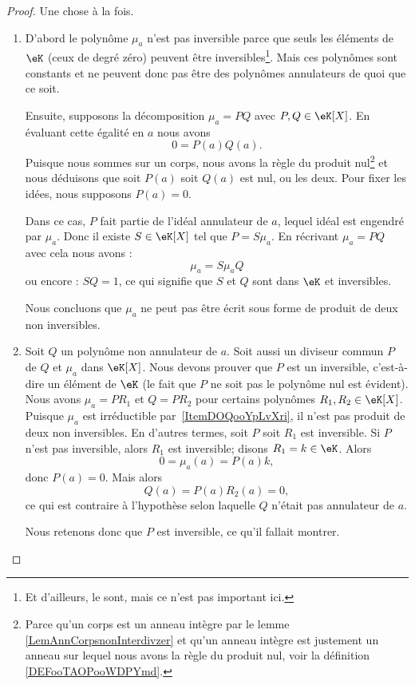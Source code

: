 \begin{proof}
	Une chose à la fois.
	\begin{enumerate}
		\item
		      D'abord le polynôme \( \mu_a\) n'est pas inversible parce que seuls les éléments de \( \eK\) (ceux de degré zéro) peuvent être inversibles\footnote{Et d'ailleurs, le sont, mais ce n'est pas important ici.}. Mais ces polynômes sont constants et ne peuvent donc pas être des polynômes annulateurs de quoi que ce soit.

		      Ensuite, supposons la décomposition \( \mu_a=PQ\) avec \( P,Q\in \eK[X]\). En évaluant cette égalité en \( a\) nous avons
		      \begin{equation}
			      0=P(a)Q(a).
		      \end{equation}
		      Puisque nous sommes sur un corps, nous avons la règle du produit nul\footnote{Parce qu'un corps est un anneau intègre par le lemme \ref{LemAnnCorpsnonInterdivzer} et qu'un anneau intègre est justement un anneau sur lequel nous avons la règle du produit nul, voir la définition \ref{DEFooTAOPooWDPYmd}.} et nous déduisons que soit \( P(a)\) soit \( Q(a)\) est nul, ou les deux. Pour fixer les idées, nous supposons \( P(a)=0\).

		      Dans ce cas, \( P\) fait partie de l'idéal annulateur de \( a\), lequel idéal est engendré par \( \mu_a\). Donc il existe \( S\in \eK[X]\) tel que \( P=S\mu_a\). En récrivant \( \mu_a=PQ\) avec cela nous avons :
		      \begin{equation}
			      \mu_a=S\mu_aQ
		      \end{equation}
		      ou encore : \( SQ=1\), ce qui signifie que \( S\) et \( Q\) sont dans \( \eK\) et inversibles.

		      Nous concluons que \( \mu_a\) ne peut pas être écrit sous forme de produit de deux non inversibles.
		\item
		      Soit \( Q\) un polynôme non annulateur de \( a\). Soit aussi un diviseur commun \( P\) de \( Q\) et \( \mu_a\) dans \( \eK[X]\). Nous devons prouver que \( P\) est un inversible, c'est-à-dire un élément de \( \eK\) (le fait que \( P\) ne soit pas le polynôme nul est évident).
		      Nous avons \( \mu_a=PR_1\) et \( Q=PR_2\) pour certains polynômes \( R_1,R_2\in \eK[X]\). Puisque \( \mu_a\) est irréductible par~\ref{ItemDOQooYpLvXri}, il n'est pas produit de deux non inversibles. En d'autres termes, soit \( P\) soit \( R_1\) est inversible. Si \( P \) n'est pas inversible, alors \( R_1\) est inversible; disons \( R_1=k\in \eK\). Alors
		      \begin{equation}
			      0=\mu_a(a)=P(a)k,
		      \end{equation}
		      donc \( P(a)=0\). Mais alors
		      \begin{equation}
			      Q(a)=P(a)R_2(a)=0,
		      \end{equation}
		      ce qui est contraire à l'hypothèse selon laquelle \( Q\) n'était pas annulateur de \( a\).

		      Nous retenons donc que \( P\) est inversible, ce qu'il fallait montrer.
	\end{enumerate}
\end{proof}

